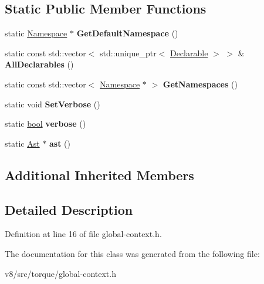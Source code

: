\subsection*{Static Public Member Functions}
\begin{DoxyCompactItemize}
\item 
\mbox{\label{classv8_1_1internal_1_1torque_1_1GlobalContext_a531e705b7f0d0d106bde511d1f665386}} 
static \mbox{\hyperlink{classv8_1_1internal_1_1torque_1_1Namespace}{Namespace}} $\ast$ {\bfseries Get\+Default\+Namespace} ()
\item 
\mbox{\label{classv8_1_1internal_1_1torque_1_1GlobalContext_adf7f9bb6c16d7b917a8d40b71ff2a6c3}} 
static const std\+::vector$<$ std\+::unique\+\_\+ptr$<$ \mbox{\hyperlink{classv8_1_1internal_1_1torque_1_1Declarable}{Declarable}} $>$ $>$ \& {\bfseries All\+Declarables} ()
\item 
\mbox{\label{classv8_1_1internal_1_1torque_1_1GlobalContext_a1562924de5cb190177401b5c463717bd}} 
static const std\+::vector$<$ \mbox{\hyperlink{classv8_1_1internal_1_1torque_1_1Namespace}{Namespace}} $\ast$ $>$ {\bfseries Get\+Namespaces} ()
\item 
\mbox{\label{classv8_1_1internal_1_1torque_1_1GlobalContext_aed9c3843208fe942ae4aa405162423f1}} 
static void {\bfseries Set\+Verbose} ()
\item 
\mbox{\label{classv8_1_1internal_1_1torque_1_1GlobalContext_a67bd30cd11e199aba73ee4319ab0e876}} 
static \mbox{\hyperlink{classbool}{bool}} {\bfseries verbose} ()
\item 
\mbox{\label{classv8_1_1internal_1_1torque_1_1GlobalContext_af88f1d83163667cb632e6dbc48606c87}} 
static \mbox{\hyperlink{classv8_1_1internal_1_1torque_1_1Ast}{Ast}} $\ast$ {\bfseries ast} ()
\end{DoxyCompactItemize}
\subsection*{Additional Inherited Members}


\subsection{Detailed Description}


Definition at line 16 of file global-\/context.\+h.



The documentation for this class was generated from the following file\+:\begin{DoxyCompactItemize}
\item 
v8/src/torque/global-\/context.\+h\end{DoxyCompactItemize}
